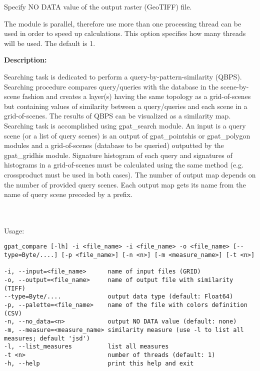 Specify NO DATA value of the output raster (GeoTIFF) file.


The module is parallel, therefore use more than one processing thread can be used in order to speed up calculations. 
This option specifies how many threads will be used. 
The default is 1.

{\bf Description:}

Searching task is dedicated to perform a query-by-pattern-similarity (QBPS). 
Searching procedure compares query/queries with the database in the scene-by-scene fashion and creates a layer(s) having the same topology as a grid-of-scenes but containing values of similarity between a query/queries and each scene in a grid-of-scenes.
The results of QBPS can be visualized as a similarity map.
Searching task is accomplished using gpat\_search module. 
An input is a query scene (or a list of query scenes) is an output of gpat\_pointshis or gpat\_polygon modules and a grid-of-scenes (database to be queried) outputted by the gpat\_gridhis module. 
Signature histogram of each query and signatures of histograms in a grid-of-scenes must be calculated using the same method (e.g. crossproduct must be used in both cases). 
The number of output map depends on the number of provided query scenes.
Each output map gets its name from the name of query scene preceded by a prefix.

{}
\\\\
Usage:

\begin{minipage}{\linewidth}
\begin{lstlisting}
gpat_compare [-lh] -i <file_name> -i <file_name> -o <file_name> [--type=Byte/....] [-p <file_name>] [-n <n>] [-m <measure_name>] [-t <n>]

-i, --input=<file_name>      name of input files (GRID)
-o, --output=<file_name>     name of output file with similarity (TIFF)
--type=Byte/....             output data type (default: Float64)
-p, --palette=<file_name>    name of the file with colors definition (CSV)
-n, --no_data=<n>            output NO DATA value (default: none)
-m, --measure=<measure_name> similarity measure (use -l to list all measures; default 'jsd')
-l, --list_measures          list all measures
-t <n>                       number of threads (default: 1)
-h, --help                   print this help and exit
\end{lstlisting}
\end{minipage}

